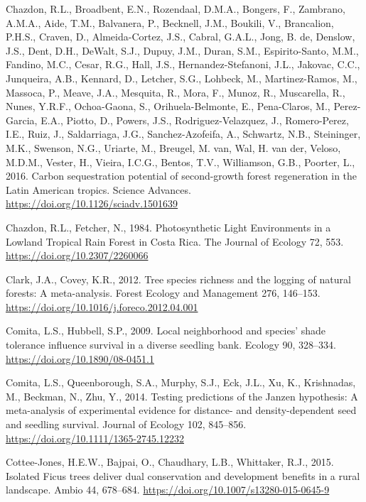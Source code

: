 \documentclass[
  12pt,
]{article}
\newlength{\cslhangindent}
\newlength{\cslentryspacingunit} %
\newenvironment{CSLReferences}[2] %
 {%
  \setlength{\parindent}{0pt}
  \ifodd #1
  \let\oldpar\par
  \def\par{\hangindent=\cslhangindent\oldpar}
  \fi
  \setlength{\parskip}{#2\cslentryspacingunit}
 }%
 {}
\begin{document}
\begin{CSLReferences}{1}{0}
\leavevmode{}%
Chazdon, R.L., Broadbent, E.N., Rozendaal, D.M.A., Bongers, F., Zambrano, A.M.A., Aide, T.M., Balvanera, P., Becknell, J.M., Boukili, V., Brancalion, P.H.S., Craven, D., Almeida-Cortez, J.S., Cabral, G.A.L., Jong, B. de, Denslow, J.S., Dent, D.H., DeWalt, S.J., Dupuy, J.M., Duran, S.M., Espirito-Santo, M.M., Fandino, M.C., Cesar, R.G., Hall, J.S., Hernandez-Stefanoni, J.L., Jakovac, C.C., Junqueira, A.B., Kennard, D., Letcher, S.G., Lohbeck, M., Martinez-Ramos, M., Massoca, P., Meave, J.A., Mesquita, R., Mora, F., Munoz, R., Muscarella, R., Nunes, Y.R.F., Ochoa-Gaona, S., Orihuela-Belmonte, E., Pena-Claros, M., Perez-Garcia, E.A., Piotto, D., Powers, J.S., Rodriguez-Velazquez, J., Romero-Perez, I.E., Ruiz, J., Saldarriaga, J.G., Sanchez-Azofeifa, A., Schwartz, N.B., Steininger, M.K., Swenson, N.G., Uriarte, M., Breugel, M. van, Wal, H. van der, Veloso, M.D.M., Vester, H., Vieira, I.C.G., Bentos, T.V., Williamson, G.B., Poorter, L., 2016. Carbon sequestration potential of second-growth forest regeneration in the {Latin American} tropics. Science Advances. \url{https://doi.org/10.1126/sciadv.1501639}

\leavevmode{}%
Chazdon, R.L., Fetcher, N., 1984. Photosynthetic {Light Environments} in a {Lowland Tropical Rain Forest} in {Costa Rica}. The Journal of Ecology 72, 553. \url{https://doi.org/10.2307/2260066}

\leavevmode{}%
Clark, J.A., Covey, K.R., 2012. Tree species richness and the logging of natural forests: {A} meta-analysis. Forest Ecology and Management 276, 146--153. \url{https://doi.org/10.1016/j.foreco.2012.04.001}

\leavevmode{}%
Comita, L.S., Hubbell, S.P., 2009. Local neighborhood and species' shade tolerance influence survival in a diverse seedling bank. Ecology 90, 328--334. \url{https://doi.org/10.1890/08-0451.1}

\leavevmode{}%
Comita, L.S., Queenborough, S.A., Murphy, S.J., Eck, J.L., Xu, K., Krishnadas, M., Beckman, N., Zhu, Y., 2014. Testing predictions of the {Janzen} hypothesis: A meta-analysis of experimental evidence for distance- and density-dependent seed and seedling survival. Journal of Ecology 102, 845--856. \url{https://doi.org/10.1111/1365-2745.12232}

\leavevmode{}%
Cottee-Jones, H.E.W., Bajpai, O., Chaudhary, L.B., Whittaker, R.J., 2015. Isolated {Ficus} trees deliver dual conservation and development benefits in a rural landscape. Ambio 44, 678--684. \url{https://doi.org/10.1007/s13280-015-0645-9}


\end{CSLReferences}
\end{document}
